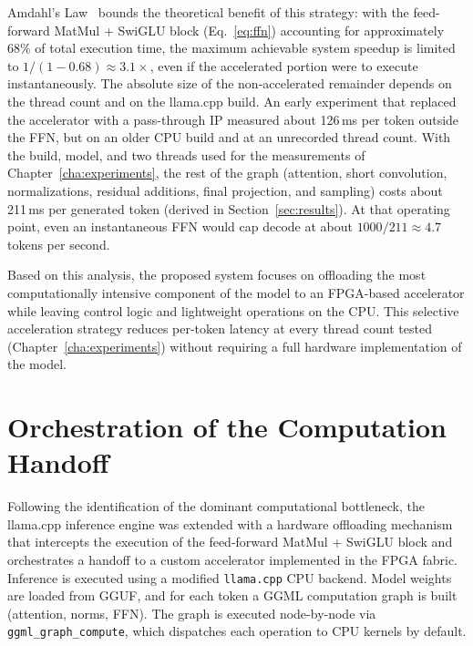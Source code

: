 Amdahl's Law~\cite{Amdahl1967ValidityOT} bounds the theoretical benefit of this
strategy: with the feed-forward MatMul + SwiGLU block (Eq.~\eqref{eq:ffn}) accounting
for approximately 68\% of total execution time, the maximum achievable system speedup
is limited to $1/(1-0.68) \approx 3.1\times$, even if the accelerated portion were to
execute instantaneously. The absolute size of the non-accelerated remainder depends on
the thread count and on the llama.cpp build. An early experiment that replaced the
accelerator with a pass-through IP measured about 126\,ms per token outside the FFN, but
on an older CPU build and at an unrecorded thread count. With the build, model, and two
threads used for the measurements of Chapter~\ref{cha:experiments}, the rest of the
graph (attention, short convolution, normalizations, residual additions, final
projection, and sampling) costs about 211\,ms per generated token (derived in
Section~\ref{sec:results}). At that operating point, even an instantaneous FFN would cap
decode at about $1000/211 \approx 4.7$ tokens per second.

Based on this analysis, the proposed system focuses on offloading the most
computationally intensive component of the model to an FPGA-based accelerator while
leaving control logic and lightweight operations on the CPU. This selective
acceleration strategy reduces per-token latency at every thread count tested
(Chapter~\ref{cha:experiments}) without requiring a full hardware implementation of the
model.

\section{Orchestration of the Computation Handoff}
\label{sec:orchestration}

Following the identification of the dominant computational bottleneck, the llama.cpp
inference engine was extended with a hardware offloading mechanism that intercepts the
execution of the feed-forward MatMul + SwiGLU block and orchestrates a handoff to a
custom accelerator implemented in the FPGA fabric. Inference is executed using a
modified \texttt{llama.cpp} CPU backend. Model weights are loaded from GGUF, and for
each token a GGML computation graph is built (attention, norms, FFN). The graph is
executed node-by-node via \texttt{ggml\_graph\_compute}, which dispatches each
operation to CPU kernels by default.

